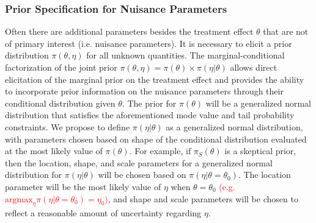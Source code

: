 \documentclass[12pt]{article}
\begin{document}
%

%



\subsubsection{Prior Specification for Nuisance Parameters}\label{sec:cond_marg}
Often there are additional parameters besides the treatment effect $\theta$ that are not of primary interest (i.e. nuisance parameters).
%
It is necessary to elicit a prior distribution $\pi(\theta,\eta)$ for all unknown quantities.
%
The marginal-conditional factorization of the joint prior $\pi(\theta,\eta)=\pi(\theta)\times\pi(\eta|\theta)$ allows direct elicitation of the marginal prior on the treatment effect and provides the ability to incorporate prior information on the nuisance parameters through their conditional distribution given $\theta$.
%
The prior for $\pi(\theta)$ will be a generalized normal distribution that satisfies the aforementioned mode value and tail probability constraints.
%
We propose to define $\pi(\eta|\theta)$ as a generalized normal distribution, with parameters chosen based on shape of the conditional distribution evaluated at the most likely value of $\pi(\theta)$. For example, if $\pi_S(\theta)$ is a skeptical prior, then the location, shape, and scale parameters for a generalized normal distribution for $\pi(\eta|\theta)$ will be chosen based on $\pi(\eta|\theta=\theta_0)$. The location parameter will be the most likely value of $\eta$ when $\theta=\theta_0$ \textcolor{red}{(e.g. $\text{argmax}_\eta \pi(\eta|\theta=\theta_0)=\eta_0)$}, and shape and scale parameters will be chosen to reflect a reasonable amount of uncertainty regarding $\eta$. 
%
\end{document}

